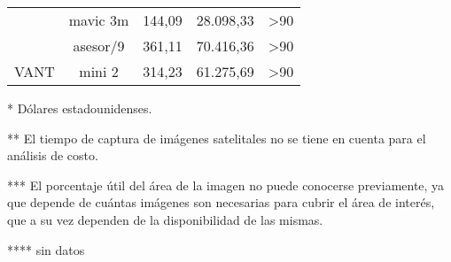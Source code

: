 \begin{table}[]
\begin{threeparttable}[b]
\begin{tabular}{ccccc}
             &
              { mavic   3m} &
              144,09 &
              28.098,33 &
              \textgreater{}90 \\
             &
              { asesor/9} &
              361,11 &
              70.416,36 &
              \textgreater{}90 \\
            \multirow{-3}{*}{VANT} &
              { mini 2} &
              314,23 &
              61.275,69 &
              \textgreater{}90 \\
             \hline
             \hline
        \end{tabular}
        \begin{tablenotes}
            \tiny{
           \item [*]Dólares estadounidenses.
           \item [**]El tiempo de captura de imágenes satelitales no se tiene en cuenta para el análisis de costo.
           \item [***]El porcentaje útil del área de la imagen no puede conocerse previamente, ya que depende de cuántas imágenes son necesarias para cubrir el área de interés, que a su vez dependen de la disponibilidad de las mismas.
           \item [****] sin datos
           }
         \end{tablenotes}
  \end{threeparttable}
\end{table}

